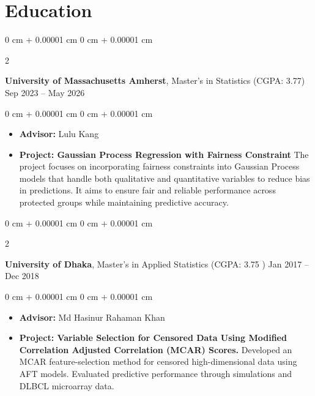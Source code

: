 \documentclass[10pt, letterpaper]{article}
\newenvironment{highlights}{
    \begin{itemize}[
        topsep=0.10 cm,
        parsep=0.10 cm,
        partopsep=0pt,
        itemsep=0pt,
        leftmargin=0 cm + 10pt
    ]
}{
    \end{itemize}
} %
\newenvironment{onecolentry}{
    \begin{adjustwidth}{
        0 cm + 0.00001 cm
    }{
        0 cm + 0.00001 cm
    }
}{
    \end{adjustwidth}
} %
\newenvironment{twocolentry}[2][]{
    \onecolentry
    \def\secondColumn{#2}
    \setcolumnwidth{\fill, 4.5 cm}
    \begin{paracol}{2}
}{
    \switchcolumn \raggedleft \secondColumn
    \end{paracol}
    \endonecolentry
} %
\begin{document}
    \section{Education}

        \begin{twocolentry}{
            Sep 2023 – May 2026
        }
            \textbf{University of Massachusetts Amherst}, Master's in Statistics (CGPA: 3.77) \end{twocolentry}

        \vspace{0.10 cm}
        \begin{onecolentry}
            \begin{highlights}
                \item \textbf{Advisor:} Lulu Kang
                \item \textbf{Project: Gaussian Process Regression with Fairness Constraint} The project focuses on incorporating fairness constraints into Gaussian Process models that handle both qualitative and quantitative variables to reduce bias in predictions. It aims to ensure fair and reliable performance across protected groups while maintaining predictive accuracy.
            \end{highlights}
        \end{onecolentry}

    \vspace{0.25 cm}
    \begin{twocolentry}{
            Jan 2017 – Dec 2018
        }
            \textbf{University of Dhaka}, Master's in Applied Statistics (CGPA: 3.75 )\end{twocolentry}
        \vspace{0.10 cm}
        \begin{onecolentry}
            \begin{highlights}
                \item \textbf{Advisor:} Md Hasinur Rahaman Khan
                \item \textbf{Project: Variable Selection for Censored Data Using Modified Correlation Adjusted Correlation (MCAR) Scores.} Developed an MCAR feature-selection method for censored high-dimensional data using AFT models. Evaluated predictive performance through simulations and DLBCL microarray data.
            \end{highlights}
        \end{onecolentry}
\end{document}
